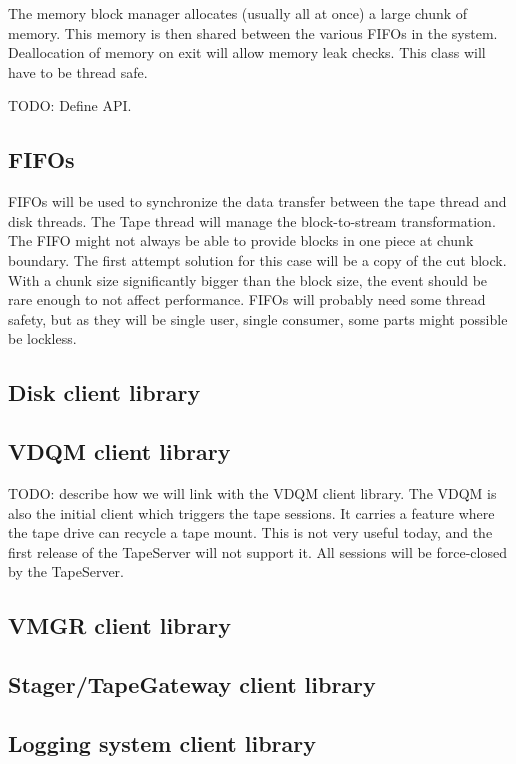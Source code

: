 The memory block manager allocates (usually all at once) a large chunk of memory.
This memory is then shared between the various FIFOs in the system. Deallocation
of memory on exit will allow memory leak checks. This class will have to be 
thread safe.

TODO: Define API.

\subsection{FIFOs}

FIFOs will be used to synchronize the data transfer between the tape thread and 
disk threads. The Tape thread will manage the block-to-stream transformation. The
FIFO might not always be able to provide blocks in one piece at chunk boundary.
The first attempt solution for this case will be a copy of the cut block. With
a chunk size significantly bigger than the block size, the event should be rare
enough to not affect performance. FIFOs will probably need some thread safety,
but as they will be single user, single consumer, some parts might possible 
be lockless.

\subsection{Disk client library}

\subsection{VDQM client library}

TODO: describe how we will link with the VDQM client library. The VDQM is also 
the initial client which triggers the tape sessions. It carries a feature
where the tape drive can recycle a tape mount. This is not very useful today,
and the first release of the TapeServer will not support it. All sessions
will be force-closed by the TapeServer.

\subsection{VMGR client library}

\subsection{Stager/TapeGateway client library}

\subsection{Logging system client library}

